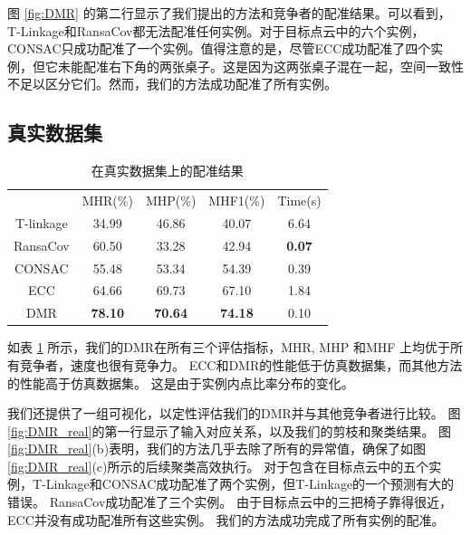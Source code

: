 图 \ref{fig:DMR} 的第二行显示了我们提出的方法和竞争者的配准结果。可以看到，T-Linkage和RansaCov都无法配准任何实例。对于目标点云中的六个实例，CONSAC只成功配准了一个实例。值得注意的是，尽管ECC成功配准了四个实例，但它未能配准右下角的两张桌子。这是因为这两张桌子混在一起，空间一致性不足以区分它们。然而，我们的方法成功配准了所有实例。

\subsection{真实数据集}
\begin{table}[ht]
        \centering
        \caption{在真实数据集上的配准结果}
        \begin{tabular}{ccccc}
        \hline\noalign{\smallskip}
        & MHR(\%)         & MHP(\%)         & MHF1(\%)         & Time(s)       \\
        \noalign{\smallskip}
        \hline
        \noalign{\smallskip}
        T-linkage  & 34.99          & 46.86          & 40.07          & 6.64          \\
        RansaCov   & 60.50          & 33.28          & 42.94          & \textbf{0.07} \\
        CONSAC     & 55.48          & 53.34          & 54.39          & 0.39          \\
        ECC        & 64.66          & 69.73          & 67.10          & 1.84          \\
        DMR   & \textbf{78.10} & \textbf{70.64} & \textbf{74.18} & 0.10        \\ 
        \hline
        \end{tabular}
        \label{tab:DMR_real}
\end{table}
      
如表 \ref{tab:DMR_real} 所示，我们的DMR在所有三个评估指标，MHR, MHP 和MHF 上均优于所有竞争者，速度也很有竞争力。 
ECC和DMR的性能低于仿真数据集，而其他方法的性能高于仿真数据集。 
这是由于实例内点比率分布的变化。 
      
我们还提供了一组可视化，以定性评估我们的DMR并与其他竞争者进行比较。 
图 \ref{fig:DMR_real}的第一行显示了输入对应关系，以及我们的剪枝和聚类结果。 
图 \ref{fig:DMR_real}(b)表明，我们的方法几乎去除了所有的异常值，确保了如图 \ref{fig:DMR_real}(c)所示的后续聚类高效执行。 
对于包含在目标点云中的五个实例，T-Linkage和CONSAC成功配准了两个实例，但T-Linkage的一个预测有大的错误。 
RansaCov成功配准了三个实例。 
由于目标点云中的三把椅子靠得很近，ECC并没有成功配准所有这些实例。 
我们的方法成功完成了所有实例的配准。
      
